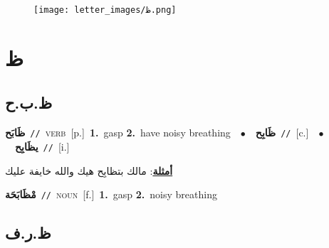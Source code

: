 \documentclass[10pt,a4paper,twoside]{article} %
\begin{document}
\begin{figure*}[t!]\centering\texttt{[image: letter\_images/ظ.png]}\end{figure*}
\color{white}

 \section*{\foreignlanguage{arabic}{ظ}} 
 \begin{multicols}{2} 

%
\color{black}
\vspace{-3mm}
\subsection*{\color{blue}\foreignlanguage{arabic}{ظ.ب.ح}\color{blue}{}} 

{\setlength\topsep{0pt}\textbf{\foreignlanguage{arabic}{ظَابَح}}\ {\color{gray}\texttt{//}\color{black}}\ \textsc{verb}\ [p.]\ \textbf{1.}~gasp  \textbf{2.}~have noisy breathing\ \ $\bullet$\ \ \setlength\topsep{0pt}\textbf{\foreignlanguage{arabic}{ظَابِح}}\ {\color{gray}\texttt{//}\color{black}}\ [c.]\ \ $\bullet$\ \ \setlength\topsep{0pt}\textbf{\foreignlanguage{arabic}{يظَابِح}}\ {\color{gray}\texttt{//}\color{black}}\ [i.]\  \begin{flushright}\color{gray}\foreignlanguage{arabic}{\textbf{\underline{\foreignlanguage{arabic}{أمثلة}}}: مالك بتظابِح هيك والله خايفة عليك}\end{flushright}\color{black}} \vspace{2mm}

{\setlength\topsep{0pt}\textbf{\foreignlanguage{arabic}{مْظَابَحَة}}\ {\color{gray}\texttt{//}\color{black}}\ \textsc{noun}\ [f.]\ \textbf{1.}~gasp  \textbf{2.}~noisy breathing\ } \vspace{2mm}

\vspace{-3mm}
\subsection*{\color{blue}\foreignlanguage{arabic}{ظ.ر.ف}\color{blue}{}} 


\end{multicols}
\end{document}
